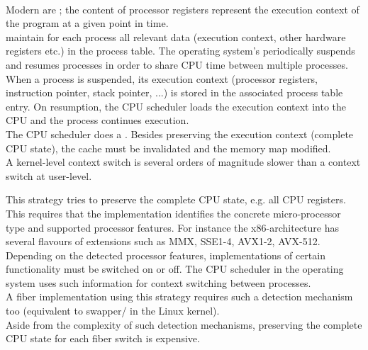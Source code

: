 \label{implementations}

\xspace\\

Modern  are ; the content of
processor registers represent the execution context of the program at a given
point in time.\\
 maintain for each process all relevant data (execution
context, other hardware registers etc.) in the process table. The operating system's
 periodically suspends and resumes processes in order to
share CPU time between multiple processes. When a process is suspended, its
execution context (processor registers, instruction pointer, stack pointer, ...)
is stored in the associated process table entry. On resumption, the CPU
scheduler loads the execution context into the CPU and the process continues
execution.\\
The CPU scheduler does a . Besides preserving
the execution context (complete CPU state), the cache must be invalidated and
the memory map modified.\\
A kernel-level context switch is several orders of magnitude slower than a
context switch at user-level\cite{Tanenbaum2009}.

 This strategy tries to
preserve the complete CPU state, e.g. all CPU registers. This requires that the
implementation identifies the concrete micro-processor type and supported processor
features. For instance the x86-architecture has several flavours of extensions
such as MMX, SSE1-4, AVX1-2, AVX-512.\\
Depending on the detected processor features, implementations of certain
functionality must be switched on or off. The CPU scheduler in the operating system
uses such information for context switching between processes.\\
A fiber implementation using this strategy requires such a detection mechanism
too (equivalent to swapper/ in the Linux kernel).\\
Aside from the complexity of such detection mechanisms, preserving the complete
CPU state for each fiber switch is expensive.


